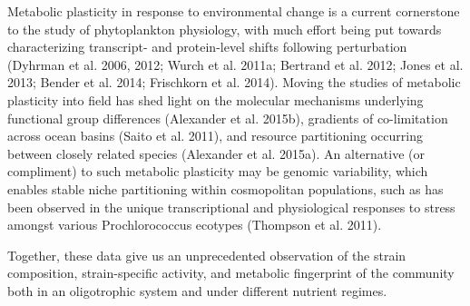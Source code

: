 Metabolic plasticity in response to environmental change is a current cornerstone to the study of phytoplankton physiology, with much effort being put towards characterizing transcript- and protein-level shifts following perturbation (Dyhrman et al. 2006, 2012; Wurch et al. 2011a; Bertrand et al. 2012; Jones et al. 2013; Bender et al. 2014; Frischkorn et al. 2014). Moving the studies of metabolic plasticity into field has shed light on the molecular mechanisms underlying functional group differences (Alexander et al. 2015b), gradients of  co-limitation across ocean basins (Saito et al. 2011), and resource partitioning occurring between closely related species (Alexander et al. 2015a). An alternative (or compliment) to such metabolic plasticity may be genomic variability, which enables stable niche partitioning within cosmopolitan populations, such as has been observed in the unique transcriptional and physiological responses to stress amongst various Prochlorococcus ecotypes (Thompson et al. 2011).

Together, these data give us an unprecedented observation of the strain composition, strain-specific activity, and metabolic fingerprint of the community both in an oligotrophic system and under different nutrient regimes. 


